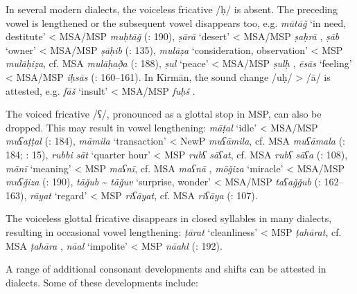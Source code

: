 \documentclass[output=paper]{langsci/langscibook}
\begin{document}

In several modern  dialects, the voiceless  fricative /ḥ/ is absent. The preceding vowel is lengthened or the subsequent vowel disappears too, e.g. \textit{mūtāǧ} ‘in need, destitute’ < MSA/MSP \textit{muḥtāǧ} (\citealt{Īzadpanāh2001}: 190), \textit{ṣārā} ‘desert’ < MSA/MSP \textit{ṣaḥrā} \citep[15]{Sarlak2002}, \textit{ṣāb} ‘owner’ < MSA/MSP \textit{ṣāḥib} (\citealt{Ṣarrāfī1996}: 135), \textit{mulāẓa} ‘consideration, observation’ < MSP \textit{mulāḥiẓa}, cf. MSA \textit{mulāḥað̣a} (\citealt{Ṣarrāfī1996}: 188), \textit{ṣul} ‘peace’ < MSA/MSP \textit{ṣulḥ} \citep{Stilo2001}, \textit{ēsās} ‘feeling’ < MSA/MSP \textit{iḥsās} (\citealt{Salāmī2004}: 160–161). In Kirmān, the sound change /uḥ/ > /ā/ is attested, e.g. \textit{fāš} ‘insult’ < MSA/MSP \textit{fuḥš} \citep{Borjian2017}.

    The voiced  fricative /ʕ/, pronounced as a glottal stop in MSP, can also be dropped. This may result in vowel lengthening: \textit{māṭal} ‘idle’ < MSA/MSP \textit{muʕaṭṭal} (\citealt{Ṣarrāfī1996}: 184), \textit{māmila} ‘transaction’ < NewP \textit{muʕāmila}, cf. MSA \textit{muʕāmala} (\citealt{Ṣarrāfī1996}: 184; \citealt{Sarlak2002}: 15), \textit{rubbi} \textit{sāt} ‘quarter hour’ < MSP \textit{rubʕ} \textit{sāʕat}, cf. MSA \textit{rubʕ} \textit{sāʕa} (\citealt{Ṣarrāfī1996}: 108), \textit{mānī} ‘meaning’ < MSP \textit{maʕnī}, cf. MSA \textit{maʕnā} \citep[15]{Sarlak2002}, \textit{mōǧiza} ‘miracle’ < MSA/MSP \textit{muʕǧiza} (\citealt{Īzadpanāh2001}: 190), \textit{tāǧub} \~{} \textit{tāǧuv} ‘surprise, wonder’ < MSA/MSP \textit{taʕaǧǧub} (\citealt{Salāmī2004}: 162–163), \textit{rāyat} ‘regard’ < MSP \textit{riʕāyat}, cf. MSA \textit{riʕāya} (\citealt{Ṣarrāfī1996}: 107).


The voiceless glottal fricative disappears in closed syllables in many  dialects, resulting in occasional vowel lengthening: \textit{ṭārat} ‘cleanliness’ < MSP \textit{ṭahārat}, cf. MSA \textit{ṭahāra} \citep[76]{Sarlak2002}, \textit{nāal} ‘impolite’ < MSP \textit{nāahl} (\citealt{Īzadpanāh2001}: 192).


A range of additional consonant developments and shifts can be attested in  dialects. Some of these developments include:
\end{document}
